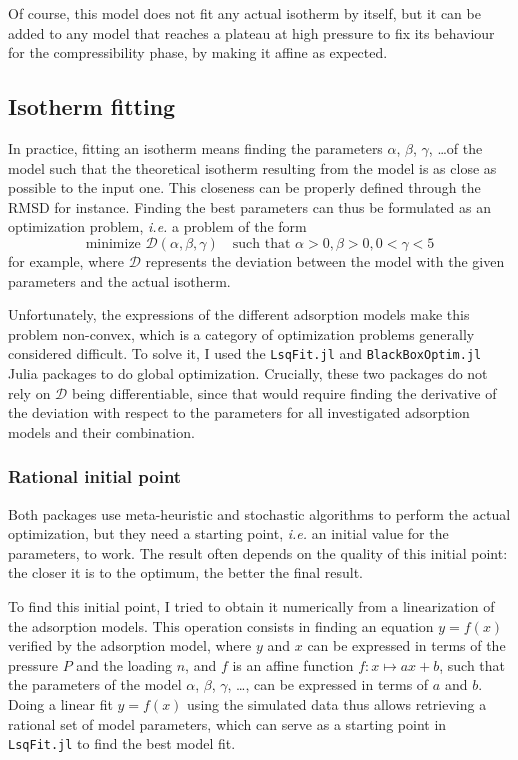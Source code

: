 \documentclass[main.tex]{subfiles}
\begin{document}
Of course, this model does not fit any actual isotherm by itself, but it can be added to any model that reaches a plateau at high pressure to fix its behaviour for the compressibility phase, by making it affine as expected.

\subsection{Isotherm fitting}

In practice, fitting an isotherm means finding the parameters $\alpha$, $\beta$, $\gamma$, \ldots of the model such that the theoretical isotherm resulting from the model is as close as possible to the input one. This closeness can be properly defined through the RMSD for instance. Finding the best parameters can thus be formulated as an optimization problem, \textit{i.e.} a problem of the form
\[\text{minimize }\mathcal D(\alpha, \beta, \gamma)\quad\text{such that }\alpha>0, \beta>0, 0<\gamma<5\]
for example, where $\mathcal D$ represents the deviation between the model with the given parameters and the actual isotherm.

Unfortunately, the expressions of the different adsorption models make this problem non-convex, which is a category of optimization problems generally considered difficult. To solve it, I used the \texttt{LsqFit.jl} and \texttt{BlackBoxOptim.jl} Julia packages to do global optimization. Crucially, these two packages do not rely on $\mathcal D$ being differentiable, since that would require finding the derivative of the deviation with respect to the parameters for all investigated adsorption models and their combination.

\subsubsection{Rational initial point}

Both packages use meta-heuristic and stochastic algorithms to perform the actual optimization, but they need a starting point, \textit{i.e.} an initial value for the parameters, to work. The result often depends on the quality of this initial point: the closer it is to the optimum, the better the final result.

To find this initial point, I tried to obtain it numerically from a linearization of the adsorption models. This operation consists in finding an equation $y = f(x)$ verified by the adsorption model, where $y$ and $x$ can be expressed in terms of the pressure $P$ and the loading $n$, and $f$ is an affine function $f:x\mapsto ax+b$, such that the parameters of the model $\alpha$, $\beta$, $\gamma$, \ldots, can be expressed in terms of $a$ and $b$. Doing a linear fit $y = f(x)$ using the simulated data thus allows retrieving a rational set of model parameters, which can serve as a starting point in \texttt{LsqFit.jl} to find the best model fit.
\end{document}

